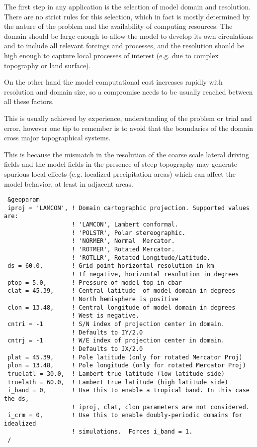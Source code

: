 The first step in any application is the selection of model domain and
resolution. There are no strict rules for this selection, which in fact is
mostly determined by the nature of the problem and the availability of
computing resources. The domain should be large enough to allow the model to
develop its own circulations and to include all relevant forcings and
processes, and the resolution should be high enough to capture local processes
of interest (e.g. due to complex topography or land surface).

On the other hand the model computational cost increases rapidly with
resolution and domain size, so a compromise needs to be usually reached
between all these factors.

This is usually achieved by experience, understanding of the problem or
trial and error, however one tip to remember is to avoid that the boundaries
of the domain cross major topographical systems.

This is because the mismatch in the resolution of the coarse scale lateral
driving fields and the model fields in the presence of steep topography may
generate spurious local effects (e.g. localized precipitation areas) which can
affect the model behavior, at least in adjacent areas. 

{\footnotesize
\begin{Verbatim}
 &geoparam
 iproj = 'LAMCON', ! Domain cartographic projection. Supported values are:
                   ! 'LAMCON', Lambert conformal.
                   ! 'POLSTR', Polar stereographic.
                   ! 'NORMER', Normal  Mercator.
                   ! 'ROTMER', Rotated Mercator.
                   ! 'ROTLLR', Rotated Longitude/Latitude.
 ds = 60.0,        ! Grid point horizontal resolution in km
                   ! If negative, horizontal resolution in degrees
 ptop = 5.0,       ! Pressure of model top in cbar
 clat = 45.39,     ! Central latitude  of model domain in degrees
                   ! North hemisphere is positive
 clon = 13.48,     ! Central longitude of model domain in degrees
                   ! West is negative.
 cntri = -1        ! S/N index of projection center in domain.
                   ! Defaults to IY/2.0
 cntrj = -1        ! W/E index of projection center in domain.
                   ! Defaults to JX/2.0
 plat = 45.39,     ! Pole latitude (only for rotated Mercator Proj)
 plon = 13.48,     ! Pole longitude (only for rotated Mercator Proj)
 truelatl = 30.0,  ! Lambert true latitude (low latitude side)
 truelath = 60.0,  ! Lambert true latitude (high latitude side)
 i_band = 0,       ! Use this to enable a tropical band. In this case the ds,
                   ! iproj, clat, clon parameters are not considered.
 i_crm = 0,        ! Use this to enable doubly-periodic domains for idealized
                   ! simulations.  Forces i_band = 1.
 /
\end{Verbatim}
}

